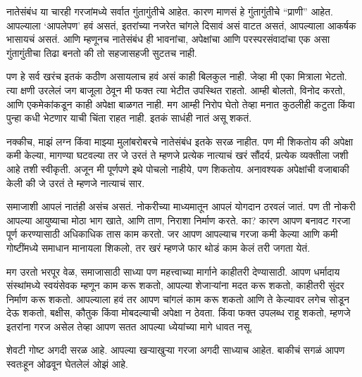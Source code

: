 नातेसंबंध या चारही गरजांमध्ये सर्वात गुंतागुंतीचे आहेत. कारण माणसं हे गुंतागुंतीचे “प्राणी” आहेत. आपल्याला ‘आपलेपण’ हवं असतं, इतरांच्या नजरेत चांगले दिसावं असं वाटत असतं, आपल्याला आकर्षक भासायचं असतं. आणि म्हणूनच नातेसंबंध ही भावनांचा, अपेक्षांचा आणि परस्परसंवादांचा एक असा गुंतागुंतीचा तिढा बनतो की तो सहजासहजी सुटतच नाही.

पण हे सर्व खरंच इतकं कठीण असायलाच हवं असं काही बिलकुल नाही. जेव्हा मी एका मित्राला भेटतो. त्या क्षणी उरलेलं जग बाजूला ठेवून मी फक्त त्या भेटीत उपस्थित राहतो. आम्ही बोलतो, विनोद करतो, आणि एकमेकांकडून काही अपेक्षा बाळगत नाही. मग आम्ही निरोप घेतो तेव्हा मनात कुठलीही कटुता किंवा पुन्हा कधी भेटणार याची चिंता राहत नाही. इतकं साधंही नातं असू शकतं.

नक्कीच, माझं लग्न किंवा माझ्या मुलांबरोबरचे नातेसंबंध इतके सरळ नाहीत. पण मी शिकतोय की अपेक्षा कमी केल्या, मागण्या घटवल्या तर जे उरतं ते म्हणजे प्रत्येक नात्याचं खरं सौंदर्य,  प्रत्येक व्यक्तीला जशी आहे तशी स्वीकृती. अजून मी पूर्णपणे इथे पोचलो नाहीये, पण शिकतोय. अनावश्यक अपेक्षांची वजाबाकी केली की जे उरतं ते म्हणजे नात्याचं सार.

समाजाशी आपलं नातंही असंच असतं. नोकरीच्या माध्यमातून आपलं योगदान ठरवलं जातं. पण ती नोकरी आपल्या आयुष्याचा मोठा भाग खाते, आणि ताण, निराशा निर्माण करते. का? कारण आपण बनावट गरजा पूर्ण करण्यासाठी अधिकाधिक तास काम करतो. जर आपण आपल्याच गरजा कमी केल्या आणि कमी गोष्टींमध्ये समाधान मानायला शिकलो, तर खरं म्हणजे फार थोडं काम केलं तरी जगता येतं.

मग उरतो भरपूर वेळ, समाजासाठी साध्या पण महत्त्वाच्या मार्गाने काहीतरी देण्यासाठी. आपण धर्मादाय संस्थांमध्ये स्वयंसेवक म्हणून काम करू शकतो, आपल्या शेजाऱ्यांना मदत करू शकतो, काहीतरी सुंदर निर्माण करू शकतो. आपल्याला हवं तर आपण चांगलं काम करू शकतो आणि ते केल्यावर लगेच सोडून देऊ शकतो,  बक्षीस, कौतुक किंवा मोबदल्याची अपेक्षा न ठेवता. किंवा फक्त उपलब्ध राहू शकतो, म्हणजे इतरांना गरज असेल तेव्हा आपण सतत आपल्या ध्येयांच्या मागे धावत नसू.

शेवटी गोष्ट अगदी सरळ आहे. आपल्या खऱ्याखुऱ्या गरजा अगदी साध्याच आहेत. बाकीचं सगळं आपण स्वतःहून ओढवून घेतलेलं ओझं आहे.

